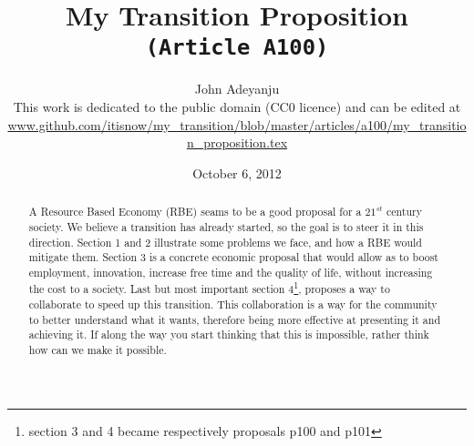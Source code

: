 \documentclass{article}
\begin{document}
\title{My Transition Proposition\\\tt{\small{(Article A100)}}\\\tt{\small{}}}%
\author{John Adeyanju\\\small{This work is dedicated to the public domain (CC0 licence) and can be edited at}\\ \scriptsize{\url{www.github.com/itisnow/my_transition/blob/master/articles/a100/my_transition_proposition.tex}}}
\date{October 6, 2012}

\maketitle

\begin{abstract}
A Resource Based Economy (RBE) seams to be a good proposal for a $21^{st}$ century society.
We believe a transition has already started, so the goal is to steer it in this direction.
Section 1 and 2 illustrate some problems we face, and how a RBE would mitigate them.
Section 3 is a concrete economic proposal that would allow as to boost employment, innovation, increase free time and the quality of life, without increasing the cost to a society.
Last but most important section 4\footnote{section 3 and 4 became respectively proposals p100 and p101}, proposes a way to collaborate to speed up this transition.
This collaboration is a way for the community to better understand what it wants, therefore being more effective at presenting it and achieving it.
If along the way you start thinking that this is impossible, rather think how can we make it possible.
\end{abstract}
\end{document}
